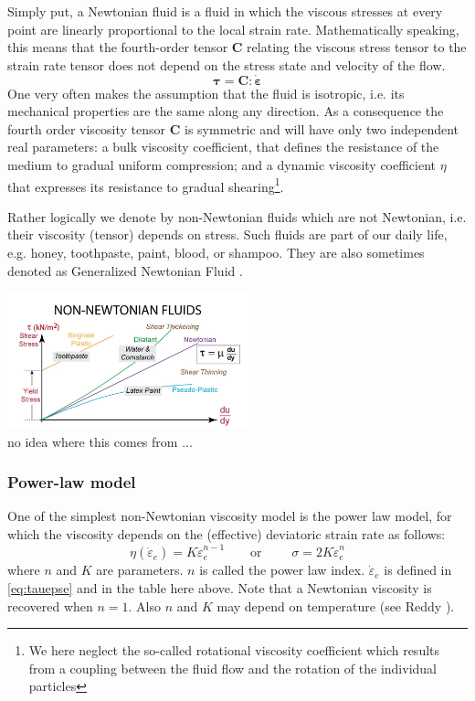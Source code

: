 Simply put, a Newtonian fluid is a fluid in which the viscous stresses at 
every point are linearly proportional 
to the local strain rate.
Mathematically speaking, this means that the fourth-order tensor ${\bm C}$ relating the viscous stress 
tensor to the strain rate tensor does not depend on the stress state and velocity of the flow.
\begin{equation}
{\bm \tau}={\bm C} : \dot{\bm \varepsilon}
\end{equation}
One very often makes the assumption that the fluid is isotropic, i.e. its mechanical properties are the 
same along any direction. As a consequence the fourth order viscosity tensor 
${\bm C}$ is symmetric and will have only two independent real parameters: 
a bulk viscosity coefficient, that defines the resistance of the medium to gradual uniform compression; 
and a dynamic viscosity coefficient $\eta$ that expresses its resistance to gradual 
shearing\footnote{We here neglect the so-called rotational viscosity coefficient which results 
from a coupling between the fluid flow and the rotation of the individual particles}.

Rather logically we denote by non-Newtonian fluids which are not Newtonian, i.e. their viscosity (tensor)
depends on stress. Such fluids are part of our daily life, e.g. honey, toothpaste, paint, blood, or shampoo.
They are also sometimes denoted as Generalized Newtonian Fluid . 

\begin{center}
\includegraphics[width=7cm]{images/rheology/nnf}\\
{\captionfont no idea where this comes from ...}
\end{center}

\subsubsection{Power-law model \label{ss:powerlaw}} 

One of the simplest non-Newtonian viscosity model is the power law model, 
for which the viscosity depends on the (effective) deviatoric strain rate as follows:
\begin{equation}
\eta(\dot{\varepsilon}_e) = K \dot{\varepsilon}_{e}^{n-1}
\qquad \text{or } \qquad
\sigma = 2 K \dot{\varepsilon}_e ^n 
\end{equation}
where $n$ and $K$ are parameters. $n$ is called the power law index. $\dot{\varepsilon}_e$ 
is defined in  \eqref{eq:tauepse} and in the table here above. 
Note that a Newtonian viscosity is recovered when $n=1$. Also $n$ and $K$ may depend on temperature
(see Reddy  \cite[p339]{reddybook2}).

